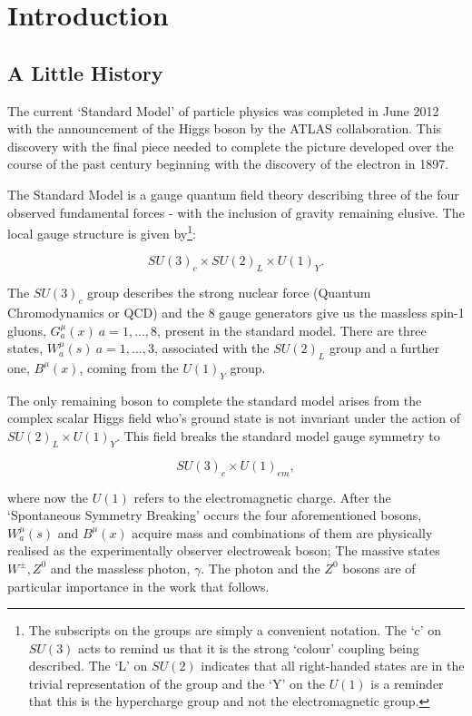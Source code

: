 \chapter{Introduction}
\label{chap:intro}

\section{A Little History}
\label{sec:history}

	The current `Standard Model' of particle physics was completed in June 2012 with the announcement of the Higgs boson by the ATLAS collaboration.
	This discovery with the final piece needed to complete the picture developed over the course of the past century beginning with the discovery of the electron in 1897.

	The Standard Model is a gauge quantum field theory describing three of the four observed fundamental forces - with the inclusion of gravity remaining elusive.
	The local gauge structure is given by\footnote{The subscripts on the groups are simply a convenient notation.  The `c' on $SU(3)$ acts to remind us that it is
	the strong `colour' coupling being described.  The `L' on $SU(2)$ indicates that all right-handed states are in the trivial representation of the group and the
	`Y' on the $U(1)$ is a reminder that this is the hypercharge group and not the electromagnetic group.}:

	\begin{equation}
		SU(3)_c\times SU(2)_L\times U(1)_Y.
		\label{eq:SMGauge}
	\end{equation}

	The $SU(3)_c$ group describes the strong nuclear force (Quantum Chromodynamics or QCD) and the 8 gauge generators give us the massless spin-1 gluons,
	$G_a^\mu(x)\ a=1,\ldots,8$, present in the standard model.
	There are three states, $W_a^\mu(s)\ a=1,\ldots,3$, associated with the $SU(2)_L$ group and a further one, $B^\mu(x)$, coming from the $U(1)_Y$ group.

	The only remaining boson to complete the standard model arises from the complex scalar Higgs field who's ground state is not invariant under the action of $SU(2)_L\times U(1)_Y$.
	This field breaks the standard model gauge symmetry to

	\begin{equation}
		SU(3)_c\times U(1)_{em},
		\label{eq:SMGaugeBroken}
	\end{equation}

	where now the $U(1)$ refers to the electromagnetic charge.  After the `Spontaneous Symmetry Breaking' occurs the four aforementioned bosons, $W_a^\mu(s)$ and $B^\mu(x)$
	acquire mass and combinations of them are physically realised as the experimentally observer electroweak boson; The massive states $W^\pm, Z^0$ and the massless photon, $\gamma$.
	The photon and the $Z^0$ bosons are of particular importance in the work that follows.

